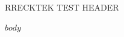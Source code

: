 \documentclass[11pt]{article}
\begin{document}
\thispagestyle{fancy}
\Huge RRECKTEK TEST HEADER

$body$
\end{document}
